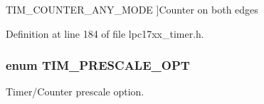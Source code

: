 \begin{Desc}
\begin{description}
{\hypertarget{group___t_i_m___public___types_ggacb2a94f8fe0bdfc2435033d97569dc2ba268780dce906ef1ae0b7fcc39c8b2cb4}{\-T\-I\-M\-\_\-\-C\-O\-U\-N\-T\-E\-R\-\_\-\-A\-N\-Y\-\_\-\-M\-O\-D\-E}\label{group___t_i_m___public___types_ggacb2a94f8fe0bdfc2435033d97569dc2ba268780dce906ef1ae0b7fcc39c8b2cb4}
}]\-Counter on both edges \end{description}
\end{Desc}



\-Definition at line 184 of file lpc17xx\-\_\-timer.\-h.

\hypertarget{group___t_i_m___public___types_gac736309e96b25f5f63cdb5418131dc18}{
\subsubsection[{\-T\-I\-M\-\_\-\-P\-R\-E\-S\-C\-A\-L\-E\-\_\-\-O\-P\-T}]{\setlength{\rightskip}{0pt plus 5cm}enum {\bf \-T\-I\-M\-\_\-\-P\-R\-E\-S\-C\-A\-L\-E\-\_\-\-O\-P\-T}}}\label{group___t_i_m___public___types_gac736309e96b25f5f63cdb5418131dc18}


\-Timer/\-Counter prescale option. 

